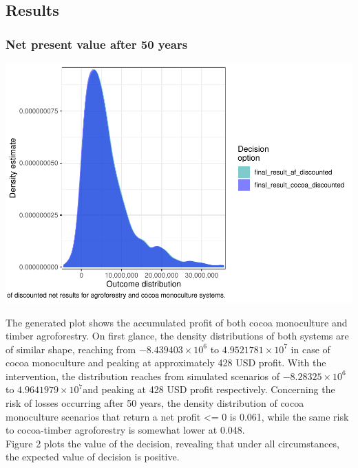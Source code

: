 \documentclass[
]{article}
\begin{document}
\hypertarget{results}{%
\subsection{Results}\label{results}}

\hypertarget{net-present-value-after-50-years}{%
\subsubsection{Net present value after 50
years}\label{net-present-value-after-50-years}}

\includegraphics{Report_files/figure-latex/distibutions-1.pdf}

The generated plot shows the accumulated profit of both cocoa
monoculture and timber agroforestry. On first glance, the density
distributions of both systems are of similar shape, reaching from
\ensuremath{-8.439403\times 10^{6}} to
\ensuremath{4.9521781\times 10^{7}} in case of cocoa monoculture and
peaking at approximately 428 USD profit. With the intervention, the
distribution reaches from simulated scenarios of
\ensuremath{-8.28325\times 10^{6}} to
\ensuremath{4.9641979\times 10^{7}}and peaking at 428 USD profit
respectively. Concerning the risk of losses occurring after 50 years,
the density distribution of cocoa monoculture scenarios that return a
net profit \textless= 0 is 0.061, while the same risk to cocoa-timber
agroforestry is somewhat lower at 0.048.\\
Figure 2 plots the value of the decision, revealing that under all
circumstances, the expected value of decision is positive.
\end{document}
